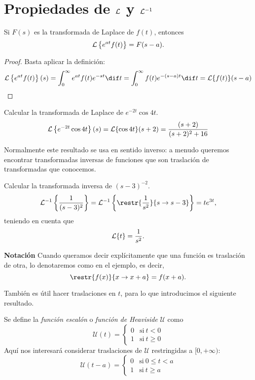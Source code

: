 \documentclass[../ecuaciones_diferenciales.tex]{subfiles}
\begin{document}
\section{Propiedades de \(\mathcal{L}\) y \(\mathcal{L}^{-1}\)}
\begin{proposition}
	Si \(F(s)\) es la transformada de Laplace de \(f(t)\), entonces
	\[\mathcal{L}\left\{e^{at}f(t)\right\} = F(s-a).\]
	\begin{proof}
		Basta aplicar la definición:
		\[\L\left\{e^{at}f(t)\right\}(s) = \int_0^\infty e^{at}f(t) e^{-st} \dif t
			= \int_0^\infty f(t) e^{-(s-a)t} \dif t = \L\{f(t)\}(s-a)\]
	\end{proof}
\end{proposition}

\begin{example}
	Calcular la transformada de Laplace de \(e^{-2t} \cos 4t\).
	\[\mathcal{L}\left\{e^{-2t} \cos 4t\right\}(s) = \mathcal{L}\{\cos 4t\}(s+2)
		= \frac{(s+2)}{(s+2)^2+16}\]
\end{example}

Normalmente este resultado se usa en sentido inverso: a menudo queremos
encontrar transformadas inversas de funciones que son traslación de
transformadas que conocemos.

\begin{example}
	Calcular la transformada inversa de \((s-3)^{-2}\).
	\[\L^{-1}\left\{\frac{1}{(s-3)^2}\right\} = \L^{-1}\left\{\restr{\frac{1}{s^2}}{s
			\to s-3}\right\} = te^{3t},\]
	teniendo en cuenta que
	\[\mathcal{L}\{t\} = \frac{1}{s^2}.\]
\end{example}

\textbf{Notación} Cuando queramos decir explícitamente que una función es
traslación de otra, lo denotaremos como en el ejemplo, es decir,
\[\restr{f(x)}{x \to x+a} = f(x+a).\]

También es útil hacer traslaciones en \(t\), para lo que introducimos el
siguiente resultado.

\begin{definition}
	Se define la \emph{función escalón} o \emph{función de Heaviside} \(\mathcal{U}\) como
	\[\mathcal{U}(t) =
		\begin{cases}
			0 & \mathrm{si}\ t < 0    \\
			1 & \mathrm{si}\ t \geq 0
		\end{cases}
	\]
	Aquí nos interesará considerar traslaciones de \(\mathcal{U}\) restringidas a
	\([0,+\infty)\):
	\[\mathcal{U}(t-a) =
		\begin{cases}
			0 & \mathrm{si}\ 0 \leq t < a \\
			1 & \mathrm{si}\ t \geq a
		\end{cases}
	\]
\end{definition}
\end{document}

